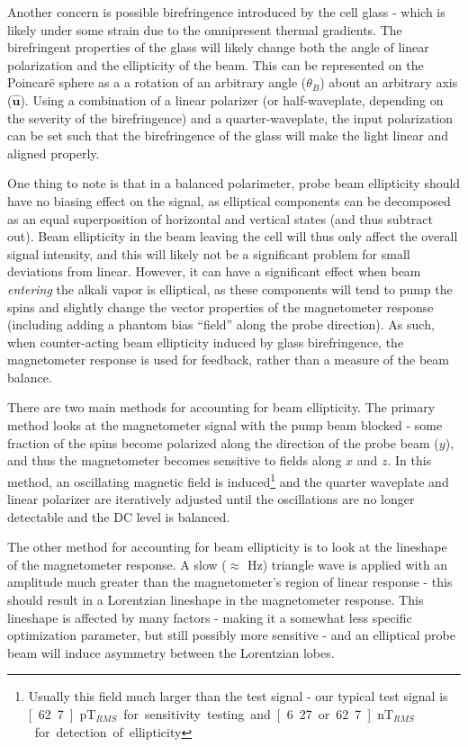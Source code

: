 \documentclass[PaulGanssle-Thesis.tex]{subfiles}
\begin{document}
Another concern is possible birefringence introduced by the cell glass - which is likely under some strain due to the omnipresent thermal gradients. The birefringent properties of the glass will likely change both the angle of linear polarization and the ellipticity of the beam. This can be represented on the Poincar\"{e} sphere as a a rotation of an arbitrary angle ($\theta_{B}$) about an arbitrary axis ($\mathbf{\hat{u}}$). Using a combination of a linear polarizer (or half-waveplate, depending on the severity of the birefringence) and a quarter-waveplate, the input polarization can be set such that the birefringence of the glass will make the light linear and aligned properly.

One thing to note is that in a balanced polarimeter, probe beam ellipticity should have no biasing effect on the signal, as elliptical components can be decomposed as an equal superposition of horizontal and vertical states (and thus subtract out). Beam ellipticity in the beam leaving the cell will thus only affect the overall signal intensity, and this will likely not be a significant problem for small deviations from linear. However, it can have a significant effect when beam \textit{entering} the alkali vapor is elliptical, as these components will tend to pump the spins and slightly change the vector properties of the magnetometer response (including adding a phantom bias ``field'' along the probe direction). As such, when counter-acting beam ellipticity induced by glass birefringence, the magnetometer response is used for feedback, rather than a measure of the beam balance.

There are two main methods for accounting for beam ellipticity. The primary method looks at the magnetometer signal with the pump beam blocked - some fraction of the spins become polarized along the direction of the probe beam ($y$), and thus the magnetometer becomes sensitive to fields along $x$ and $z$. In this method, an oscillating magnetic field is induced\footnote{Usually this field much larger than the test signal - our typical test signal is \unit[62.7]{pT$_{RMS}$} for sensitivity testing and \unit[6.27 or 62.7]{nT$_{RMS}$} for detection of ellipticity} and the quarter waveplate and linear polarizer are iteratively adjusted until the oscillations are no longer detectable and the DC level is balanced.

The other method for accounting for beam ellipticity is to look at the lineshape of the magnetometer response. A slow ($\approx$ \unit[1-3]{Hz}) triangle wave is applied with an amplitude much greater than the magnetometer's region of linear response - this should result in a Lorentzian lineshape in the magnetometer response. This lineshape is affected by many factors - making it a somewhat less specific optimization parameter, but still possibly more sensitive - and an elliptical probe beam will induce asymmetry between the Lorentzian lobes.
\end{document}
